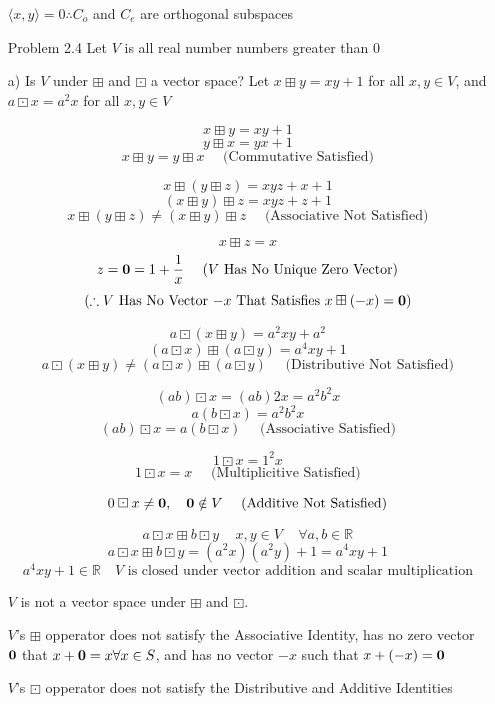 \documentclass[12pt]{article}
\begin{document}
\begin{enumerate}
\begin{framed}
$\langle x,y\rangle=0\therefore C_o$ and $C_e$ are orthogonal subspaces
\end{framed}

\newpage

\item[Problem 2.4] Let $V$ is all real number numbers greater than 0

a) Is $V$ under $\boxplus$ and $\boxdot$ a vector space? Let
$x\boxplus y=xy+1$ for all $x,y\in V$, and $a\boxdot x=a^2x$ for all $x,y\in V$

\[x\boxplus y=xy+1\]
\[y\boxplus x=yx+1\]
\[x\boxplus y=y\boxplus x\quad\text{ (Commutative Satisfied)}\]

\[x\boxplus (y\boxplus z)=xyz+x+1\]
\[(x\boxplus y)\boxplus z=xyz+z+1\]
\[x\boxplus (y\boxplus z)\neq (x\boxplus y)\boxplus z\quad\text{ (Associative Not Satisfied)}\]

\[x\boxplus z=x\]
\[z=\bold{0} =1+\frac{1}{x}\quad\text{ ($V$ Has No Unique Zero Vector)}\]
\[(\therefore \text{$V$ Has No Vector $-x$ That Satisfies $x\boxplus (-x)=\bold{0}$})\]

\[a\boxdot (x\boxplus y)=a^2xy+a^2\]
\[(a\boxdot x)\boxplus (a\boxdot y)=a^4xy+1\]
\[a\boxdot (x\boxplus y)\neq(a\boxdot x)\boxplus (a\boxdot y)\quad\text{ (Distributive Not Satisfied)}\]

\[(ab)\boxdot x=(ab)2x=a^2b^2x\]
\[a(b\boxdot x)=a^2b^2x\]
\[(ab)\boxdot x=a(b\boxdot x)\quad\text{ (Associative Satisfied)}\]

\[1\boxdot x=1^2x\]
\[1\boxdot x=x\quad\text{ (Multiplicitive Satisfied)}\]

\[0\boxdot x\neq\bold{0},\quad\bold{0}\notin V\quad\text{ (Additive Not Satisfied)}\]

\[a\boxdot x\boxplus b\boxdot y\, \quad x,y\in V\, \quad \forall a,b\in\mathbb{R}\]
\[a\boxdot x\boxplus b\boxdot y=(a^2x)(a^2y)+1=a^4xy+1\]
\[a^4xy+1 \in \mathbb{R}\quad\text{$V$ is closed under vector addition and scalar multiplication}\]

\begin{framed}
$V$ is not a vector space under $\boxplus$ and $\boxdot$.

$V$'s $\boxplus$ opperator does not satisfy the Associative Identity,
has no zero vector $\bold{0}$ that $x+\bold{0}=x\forall x\in S$, and has no vector $-x$ such that 
$x+(-x)=\bold{0}$

$V$'s $\boxdot$ opperator does not satisfy the Distributive and Additive Identities
\end{framed}


\end{enumerate}
\end{document}
